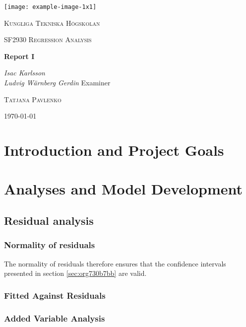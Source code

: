 \documentclass[11pt]{article}
\author{Ludde}
\date{\today}
\title{}
\begin{document}
\begin{titlepage}
\centering
\texttt{[image: example-image-1x1]}\par\vspace{1cm}
{\scshape\LARGE Kungliga Tekniska Högskolan \par}
\vspace{1cm}
{\scshape\Large SF2930 Regression Analysis \par}
\vspace{1.5cm}
{\huge\bfseries Report I \\  \par}
\vspace{2cm}
{\Large\itshape Isac Karlsson\\ Ludvig Wärnberg Gerdin}
\vfill
Examiner \par
\textsc{Tatjana Pavlenko}

\vfill

{\large \today\par}
\end{titlepage}

\newpage
\tableofcontents
\newpage

\section{Introduction and Project Goals}
\label{sec:orgfd704c2}
\section{Analyses and Model Development}
\label{sec:orgf4dc896}
\subsection{Residual analysis}
\label{sec:org978b79e}
\subsubsection{Normality of residuals}
\label{sec:org7242c9e}

The normality of residuals therefore ensures that the confidence intervals presented in section \ref{sec:org730b7bb}
are valid.

\subsubsection{Fitted Against Residuals}
\label{sec:orgb065d6b}
\subsubsection{Added Variable Analysis}
\label{sec:orgd033f63}
\end{document}
